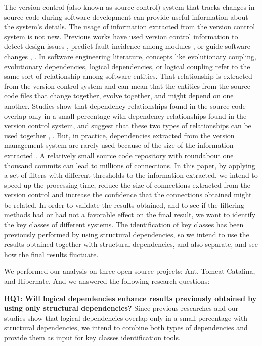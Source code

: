 \documentclass[runningheads]{comsis2}
\begin{document}
The version control (also known as source control) system that tracks changes in source code during software development can provide useful information about the system's details. 
The usage of information extracted from the version control system is not new. Previous works have used version control information to detect design issues \cite{Zimmermann:2004:MVH:998675.999460}, predict fault incidence among modules \cite{Predictingfaultincidence}, \cite{Cataldo2009SoftwareDW} or guide software changes \cite{4815274}, \cite{DBLP:journals/ese/AjienkaCC18}.
In software engineering literature, concepts like evolutionary coupling, evolutionary dependencies, logical dependencies, or logical coupling refer to the same sort of relationship among software entities. That relationship is extracted from the version control system and can mean that the entities from the source code files that change together, evolve together, and might depend on one another. Studies show that dependency relationships found in the source code overlap only in a small percentage with dependency relationships found in the version control system, and suggest that these two types of relationships can be used together \cite{Oliva:2011:ISL:2067853.2068086}, \cite{DBLP:journals/jss/AjienkaC17}. But, in practice, dependencies extracted from the version management system are rarely used because of the size of the information extracted \cite{Shtern:2012:CMS:2332427.2332428}. A relatively small source code repository with roundabout one thousand commits can lead to millions of connections. 
In this paper, by applying a set of filters with different thresholds to the information extracted, we intend to speed up the processing time, reduce the size of connections extracted from the version control and increase the confidence that the connections obtained might be related.
In order to validate the results obtained, and to see if the filtering methods had or had not a favorable effect on the final result, we want to identify the key classes of different systems. The identification of key classes has been previously performed by using structural dependencies, so
we intend to use the results obtained together with structural dependencies, and also separate, and see how the final results fluctuate.

We performed our analysis on three open
source projects: Ant, Tomcat Catalina, and Hibernate. And we answered the following research questions:

\textbf{RQ1: Will logical dependencies enhance results previously obtained by using only structural dependencies?}
Since previous researches and our studies show that logical dependencies overlap only in a small percentage with structural dependencies, we intend to combine both types of dependencies and provide them as input for key classes identification tools.
\end{document}
